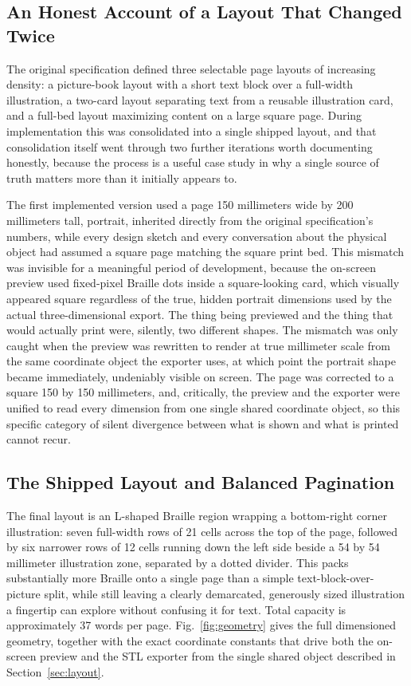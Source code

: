 \documentclass[conference]{IEEEtran}
\begin{document}
\subsection{An Honest Account of a Layout That Changed Twice}

The original specification defined three selectable page layouts of increasing density: a picture-book layout with a short text block over a full-width illustration, a two-card layout separating text from a reusable illustration card, and a full-bed layout maximizing content on a large square page. During implementation this was consolidated into a single shipped layout, and that consolidation itself went through two further iterations worth documenting honestly, because the process is a useful case study in why a single source of truth matters more than it initially appears to.

The first implemented version used a page 150 millimeters wide by 200 millimeters tall, portrait, inherited directly from the original specification's numbers, while every design sketch and every conversation about the physical object had assumed a square page matching the square print bed. This mismatch was invisible for a meaningful period of development, because the on-screen preview used fixed-pixel Braille dots inside a square-looking card, which visually appeared square regardless of the true, hidden portrait dimensions used by the actual three-dimensional export. The thing being previewed and the thing that would actually print were, silently, two different shapes. The mismatch was only caught when the preview was rewritten to render at true millimeter scale from the same coordinate object the exporter uses, at which point the portrait shape became immediately, undeniably visible on screen. The page was corrected to a square 150 by 150 millimeters, and, critically, the preview and the exporter were unified to read every dimension from one single shared coordinate object, so this specific category of silent divergence between what is shown and what is printed cannot recur.

\subsection{The Shipped Layout and Balanced Pagination}

The final layout is an L-shaped Braille region wrapping a bottom-right corner illustration: seven full-width rows of 21 cells across the top of the page, followed by six narrower rows of 12 cells running down the left side beside a 54 by 54 millimeter illustration zone, separated by a dotted divider. This packs substantially more Braille onto a single page than a simple text-block-over-picture split, while still leaving a clearly demarcated, generously sized illustration a fingertip can explore without confusing it for text. Total capacity is approximately 37 words per page. Fig.~\ref{fig:geometry} gives the full dimensioned geometry, together with the exact coordinate constants that drive both the on-screen preview and the STL exporter from the single shared object described in Section~\ref{sec:layout}.
\end{document}
